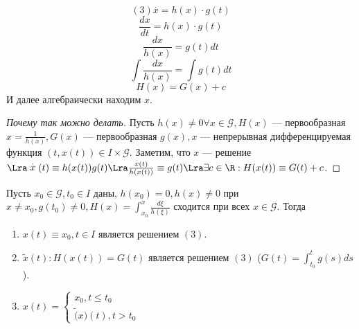 \begin{example}
    \[(3) \stackrel{.}{x} = h(x) \cdot g(t)\]
    \[\frac{dx}{dt} = h(x) \cdot g(t)\]
    \[\frac{dx}{h(x)} = g(t)dt\]
    \[\int \frac{dx}{h(x)} = \int g(t)dt\]
    \[H(x) = G(x) + c\]
    И далее алгебраически находим \(x\).
\end{example}
\begin{proof}[Почему так можно делать]
    Пусть \(h(x) \ne 0 \forall x \in \mathcal{G}, H(x)\) --- первообразная \(x = \frac{1}{h(x)}, G(x)\) --- первообразная \(g(x), x\) --- непрерывная дифференцируемая функция \((t, x(t)) \in I \times \mathcal{G}\). Заметим, что \(x\) --- решение \(\Lra \stackrel{.}{x}(t) \equiv h(x(t)) g(t) \Lra \frac{\stackrel{.}{x}(t)}{h(x(t))} \equiv g(t) \Lra \exists c \in \R: H(x(t)) \equiv G(t) + c\).

\end{proof}

Пусть \(x_0 \in \mathcal{G}, t_0 \in I\) даны, \(h(x_0) = 0, h(x) \ne 0\) при \(x \ne x_0, g(t_0) \ne 0, H(x) = \int_{x_0}^x \frac{d\xi}{h(\xi)}\) сходится при всех \(x \in \mathcal{G}\). Тогда 
\begin{enumerate}
    \item \(x(t) \equiv x_0, t \in I\) является решением \((3)\).
    
    \item \(\tilde{x}(t): H(x(t)) = G(t)\) является решением \((3)\) (\(G(t) = \int_{t_0}^t g(s)ds\)).
    
    \item \(x(t) = \left\{\begin{array}{l}
        x_0, t \le t_0 \\
        \tilde(x)(t), t > t_0
    \end{array}\right.\)
\end{enumerate}